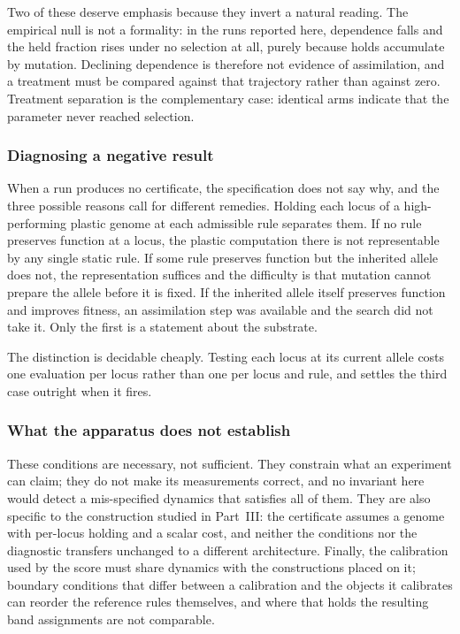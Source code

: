 \documentclass[man,12pt,floatsintext,donotrepeattitle]{apa7}
\begin{document}
Two of these deserve emphasis because they invert a natural reading. The empirical
null is not a formality: in the runs reported here, dependence falls and the held
fraction rises under no selection at all, purely because holds accumulate by
mutation. Declining dependence is therefore not evidence of assimilation, and a
treatment must be compared against that trajectory rather than against zero.
Treatment separation is the complementary case: identical arms indicate that the
parameter never reached selection.

\subsubsection*{Diagnosing a negative result}

When a run produces no certificate, the specification does not say why, and the three
possible reasons call for different remedies. Holding each locus of a high-performing
plastic genome at each admissible rule separates them. If no rule preserves function
at a locus, the plastic computation there is not representable by any single static
rule. If some rule preserves function but the inherited allele does not, the
representation suffices and the difficulty is that mutation cannot prepare the allele
before it is fixed. If the inherited allele itself preserves function and improves
fitness, an assimilation step was available and the search did not take it. Only the
first is a statement about the substrate.

The distinction is decidable cheaply. Testing each locus at its current allele costs
one evaluation per locus rather than one per locus and rule, and settles the third
case outright when it fires.

\subsubsection*{What the apparatus does not establish}

These conditions are necessary, not sufficient. They constrain what an experiment can
claim; they do not make its measurements correct, and no invariant here would detect a
mis-specified dynamics that satisfies all of them. They are also specific to the
construction studied in Part~III: the certificate assumes a genome with per-locus
holding and a scalar cost, and neither the conditions nor the diagnostic transfers
unchanged to a different architecture. Finally, the calibration used by the score must
share dynamics with the constructions placed on it; boundary conditions that differ
between a calibration and the objects it calibrates can reorder the reference rules
themselves, and where that holds the resulting band assignments are not comparable.
\end{document}
